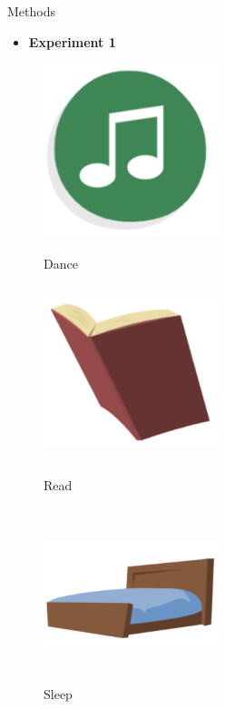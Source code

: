 \documentclass[final]{beamer}
\newlength{\colwidth}
\begin{document}
\begin{frame}[t]
\begin{columns}[t]
\begin{column}{\colwidth}
\begin{block}{Methods}
    \begin{itemize}
      \item \textbf{Experiment 1}
    \end{itemize}
    \begin{figure}
      \begin{minipage}[t]{0.2\linewidth}
        \centering
        \includegraphics[width=2in, height=2in]{figures/dance.png}
        \caption{Dance}
      \end{minipage}
      \begin{minipage}[t]{0.2\linewidth}
        \centering
        \includegraphics[width=2in, height=2in]{figures/read.png}
        \caption{Read}
      \end{minipage}%
      \begin{minipage}[t]{0.2\linewidth}
        \centering
        \includegraphics[width=2in, height=2in]{figures/sleep.png}
        \caption{Sleep}
      \end{minipage}
      \begin{minipage}[t]{0.2\linewidth}

\end{minipage}
\end{figure}
\end{block}
\end{column}
\end{columns}
\end{frame}
\end{document}
